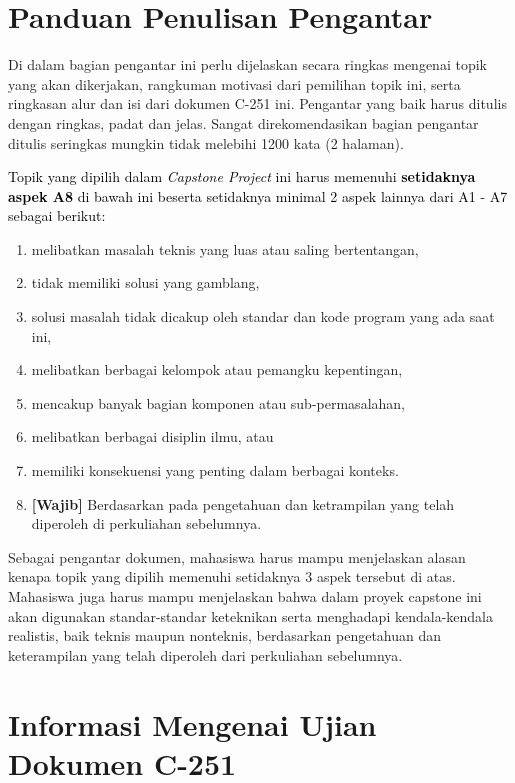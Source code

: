 \section{Panduan Penulisan Pengantar}
\label{sec:Panduan_Penulisan_Pengantar}

Di dalam bagian pengantar ini perlu dijelaskan secara ringkas mengenai topik yang akan dikerjakan, rangkuman motivasi dari pemilihan topik ini, serta ringkasan alur dan isi dari dokumen C-251 ini. Pengantar yang baik harus ditulis dengan ringkas, padat dan jelas. Sangat direkomendasikan bagian pengantar ditulis seringkas mungkin tidak melebihi 1200 kata (2 halaman).

\textcolor{black}{Topik yang dipilih dalam \textit{Capstone Project} ini harus memenuhi \textbf{setidaknya aspek A8} di bawah ini beserta setidaknya minimal 2 aspek lainnya dari A1 - A7 sebagai berikut:}
\begin{enumerate}[label=A\arabic*.]
    \item melibatkan masalah teknis yang luas atau saling bertentangan,
    \item tidak memiliki solusi yang gamblang,
    \item solusi masalah tidak dicakup oleh standar dan kode program yang ada saat ini,
    \item melibatkan berbagai kelompok atau pemangku kepentingan,
    \item mencakup banyak bagian komponen atau sub-permasalahan,
    \item melibatkan berbagai disiplin ilmu, atau
    \item memiliki konsekuensi yang penting dalam berbagai konteks.
    \item \textbf{[Wajib]} Berdasarkan pada pengetahuan dan ketrampilan yang telah diperoleh di perkuliahan sebelumnya.
\end{enumerate}
Sebagai pengantar dokumen, mahasiswa harus mampu menjelaskan alasan kenapa topik yang dipilih memenuhi setidaknya 3 aspek tersebut di atas. Mahasiswa juga harus mampu menjelaskan bahwa dalam proyek capstone ini akan digunakan standar-standar keteknikan serta menghadapi kendala-kendala realistis, baik teknis maupun nonteknis, berdasarkan pengetahuan dan keterampilan yang telah diperoleh dari perkuliahan sebelumnya.

\section{Informasi Mengenai Ujian Dokumen C-251}
\label{sec:Ujian_Dokumen_C-251}
    
